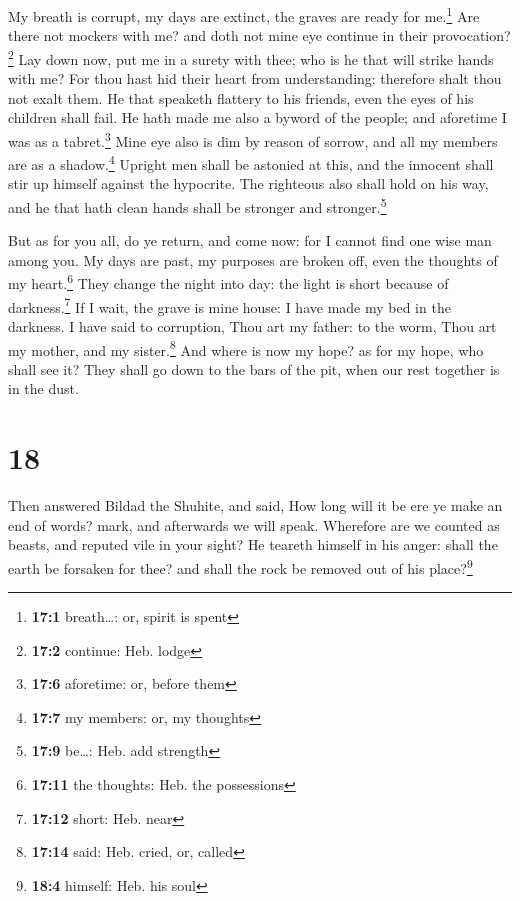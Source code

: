  My breath is corrupt, my days are extinct, the graves are
ready for me.\footnote{\textbf{17:1} breath\ldots: or, spirit is spent}
 Are there not mockers with me? and doth not mine eye
continue in their provocation?\footnote{\textbf{17:2} continue: Heb.
  lodge}  Lay down now, put me in a surety with thee; who
is he that will strike hands with me?  For thou hast hid
their heart from understanding: therefore shalt thou not exalt them.
 He that speaketh flattery to his friends, even the eyes
of his children shall fail.  He hath made me also a byword
of the people; and aforetime I was as a tabret.\footnote{\textbf{17:6}
  aforetime: or, before them}  Mine eye also is dim by
reason of sorrow, and all my members are as a shadow.\footnote{\textbf{17:7}
  my members: or, my thoughts}  Upright men shall be
astonied at this, and the innocent shall stir up himself against the
hypocrite.  The righteous also shall hold on his way, and
he that hath clean hands shall be stronger and stronger.\footnote{\textbf{17:9}
  be\ldots: Heb. add strength}

 But as for you all, do ye return, and come now: for I
cannot find one wise man among you.  My days are past, my
purposes are broken off, even the thoughts of my heart.\footnote{\textbf{17:11}
  the thoughts: Heb. the possessions}  They change the
night into day: the light is short because of darkness.\footnote{\textbf{17:12}
  short: Heb. near}  If I wait, the grave is mine house:
I have made my bed in the darkness.  I have said to
corruption, Thou art my father: to the worm, Thou art my mother, and my
sister.\footnote{\textbf{17:14} said: Heb. cried, or, called}
 And where is now my hope? as for my hope, who shall see
it?  They shall go down to the bars of the pit, when our
rest together is in the dust.

\hypertarget{section-17}{%
\section{18}\label{section-17}}

 Then answered Bildad the Shuhite, and said,
 How long will it be ere ye make an end of words? mark,
and afterwards we will speak.  Wherefore are we counted as
beasts, and reputed vile in your sight?  He teareth
himself in his anger: shall the earth be forsaken for thee? and shall
the rock be removed out of his place?\footnote{\textbf{18:4} himself:
  Heb. his soul}

